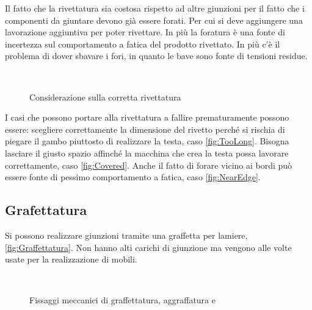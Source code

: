 Il fatto che la rivettatura sia costosa rispetto ad altre giunzioni per il fatto che i componenti da giuntare devono già essere forati. Per cui si deve aggiungere una lavorazione aggiuntiva per poter rivettare.
In più la foratura è una fonte di incertezza sul comportamento a fatica del prodotto rivettato.
In più c'è il problema di dover sbavare i fori, in quanto le bave sono fonte di tensioni residue.

\begin{figure}
\centering
{}\quad
{}\\
\quad
{}
\caption{Considerazione sulla corretta rivettatura}
\label{fig:ConsRiv}
\end{figure}
I casi che possono portare alla rivettatura a fallire prematuramente possono essere:
scegliere correttamente la dimensione del rivetto perché si rischia di piegare il gambo piuttosto di realizzare la testa, caso \ref{fig:TooLong}.
Bisogna lasciare il giusto spazio affinché la macchina che crea la testa possa lavorare correttamente, caso \ref{fig:Covered}.
Anche il fatto di forare vicino ai bordi può essere fonte di pessimo comportamento a fatica, caso \ref{fig:NearEdge}.

\subsection{Grafettatura}
Si possono realizzare giunzioni tramite una graffetta per lamiere, \ref{fig:Graffettatura}.
Non hanno alti carichi di giunzione ma vengono alle volte usate per la realizzazione di mobili.

\begin{figure}
\centering
{}\:
\\
\caption{Fissaggi meccanici di graffettatura, aggraffatura e }
\label{fig:GripMec}
\end{figure}

